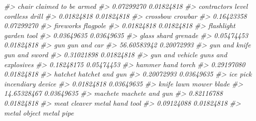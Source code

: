 \documentclass[
  12pt,
]{book}
\newenvironment{Shaded}{\begin{snugshade}}{\end{snugshade}}
\newcommand{\CommentTok}[1]{\textcolor[rgb]{0.37,0.37,0.37}{\textit{#1}}}
\begin{document}
\begin{Shaded}
\begin{Highlighting}[]
\CommentTok{\#>                            chair              claimed to be armed }
\CommentTok{\#>                       0.07299270                       0.01824818 }
\CommentTok{\#>               contractor\textquotesingle{}s level                   cordless drill }
\CommentTok{\#>                       0.01824818                       0.01824818 }
\CommentTok{\#>                         crossbow                          crowbar }
\CommentTok{\#>                       0.16423358                       0.07299270 }
\CommentTok{\#>                        fireworks                         flagpole }
\CommentTok{\#>                       0.01824818                       0.01824818 }
\CommentTok{\#>                       flashlight                      garden tool }
\CommentTok{\#>                       0.03649635                       0.03649635 }
\CommentTok{\#>                      glass shard                          grenade }
\CommentTok{\#>                       0.05474453                       0.01824818 }
\CommentTok{\#>                              gun                      gun and car }
\CommentTok{\#>                      56.60583942                       0.20072993 }
\CommentTok{\#>                    gun and knife                    gun and sword }
\CommentTok{\#>                       0.31021898                       0.01824818 }
\CommentTok{\#>                  gun and vehicle              guns and explosives }
\CommentTok{\#>                       0.18248175                       0.05474453 }
\CommentTok{\#>                           hammer                       hand torch }
\CommentTok{\#>                       0.29197080                       0.01824818 }
\CommentTok{\#>                          hatchet                  hatchet and gun }
\CommentTok{\#>                       0.20072993                       0.03649635 }
\CommentTok{\#>                         ice pick                incendiary device }
\CommentTok{\#>                       0.01824818                       0.03649635 }
\CommentTok{\#>                            knife                 lawn mower blade }
\CommentTok{\#>                      14.65328467                       0.03649635 }
\CommentTok{\#>                          machete                  machete and gun }
\CommentTok{\#>                       0.82116788                       0.01824818 }
\CommentTok{\#>                     meat cleaver                  metal hand tool }
\CommentTok{\#>                       0.09124088                       0.01824818 }
\CommentTok{\#>                     metal object                       metal pipe }

\end{Highlighting}
\end{Shaded}
\end{document}
